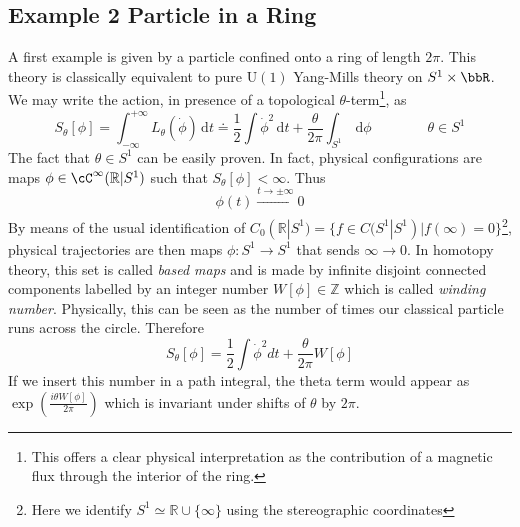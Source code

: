 \documentclass[11pt]{article}
\theoremstyle{definition}
\numberwithin{equation}{section}
\newcommand*\U{\mathrm{U}}
\begin{document}
\subsection{Example 2 Particle in a Ring}
A first example is given by a particle confined onto a ring of length $2\pi$. This theory is classically equivalent to pure $\U(1)$ Yang-Mills theory on $S^{1}\times\bbR$. We may write the action, in presence of a topological $\theta$-term\footnote{This offers a clear physical interpretation as the contribution of a magnetic flux through the interior of the ring.}, as
\begin{equation}
    S_\theta[\phi]= \int_{-\infty}^{+\infty} L_{\theta}(\Dot{\phi})\, \mathrm dt \doteq \frac{1}{2}\int \dot \phi^2\, \mathrm dt + \frac{\theta}{2\pi}\int_{S^1}\, \mathrm d\phi\qquad\qquad \theta\in S^1
\end{equation}
The fact that $\theta\in S^{1}$ can be easily proven. In fact, physical configurations are maps $\phi \in \cC^{\infty}(\mathbb{R}| S^1)$ such that $S_{\theta}[\phi]< \infty$. Thus
\begin{equation}
    \phi(t) \xrightarrow[]{t \to \pm \infty} 0
\end{equation}
By means of the usual identification of ${C}_0(\mathbb{R}|S^1) =\{f \in {C}(S^1| S^1) | f(\infty)=0\}$\footnote{Here we identify $S^1 \simeq \mathbb{R} \cup \{\infty\}$ using the stereographic coordinates}, physical trajectories are then maps $\phi: S^1 \to S^1$ that sends $\infty \to 0$. In homotopy theory, this set is called \textit{based maps} and is made by infinite disjoint connected components labelled by an integer number $ W[\phi] \in \mathbb{Z}$ which is called \textit{winding number}. Physically, this can be seen as the number of times our classical particle runs across the circle. Therefore
\begin{equation}
    S_{\theta}[\phi] = \frac{1}{2} \int \Dot{\phi}^2 dt + \frac{\theta}{2 \pi} W[\phi]
\end{equation}
If we insert this number in a path integral, the theta term would appear as $\exp(\frac{i \theta W[\phi]}{2\pi})$ which is invariant under shifts of $\theta$ by $2 \pi$.
\end{document}
